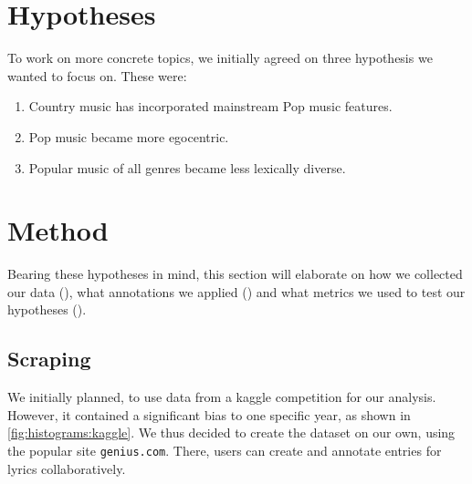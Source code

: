 \documentclass[11pt,a4paper]{article}
\begin{document}
\section{Hypotheses}\label{sec:hypotheses}

To work on more concrete topics, we initially agreed on three hypothesis we wanted to focus on. These were:

\begin{enumerate}[$H_1$]
	\item \label{hypo:country} Country music has incorporated mainstream Pop music features.
	\item \label{hypo:ego} Pop music became more egocentric. 
	\item \label{hypo:lexical} Popular music of all genres became less lexically diverse. 
	
\end{enumerate}


\section{Method}\label{sec:method}

Bearing these hypotheses in mind, this section will elaborate on how we collected our data (), what annotations we applied () and what metrics we used to test our hypotheses (). 
\subsection{Scraping}\label{sec:scraping}

We initially planned, to use data from a kaggle competition \citep{kuznetsov_55000+_2017} for our analysis. However, it contained a significant bias to one specific year, as shown in \cref{fig:histograms:kaggle}. We thus decided to create the dataset on our own, using the popular site \texttt{genius.com}. There, users can create and annotate entries for lyrics collaboratively.
\end{document}
